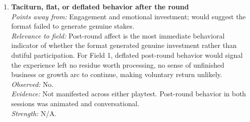 \begin{enumerate}

\item \textbf{Taciturn, flat, or deflated behavior after the round}\\
\textit{Points away from:} Engagement and emotional investment; would suggest the format failed to generate genuine stakes.\\
\textit{Relevance to field:} Post-round affect is the most immediate behavioral indicator of whether the format generated genuine investment rather than dutiful participation. For Field 1, deflated post-round behavior would signal the experience left no residue worth processing, no sense of unfinished business or growth arc to continue, making voluntary return unlikely.\\
\textit{Observed:} No.\\
\textit{Evidence:} Not manifested across either playtest. Post-round behavior in both sessions was animated and conversational.\\
\textit{Strength:} N/A.


\end{enumerate}
